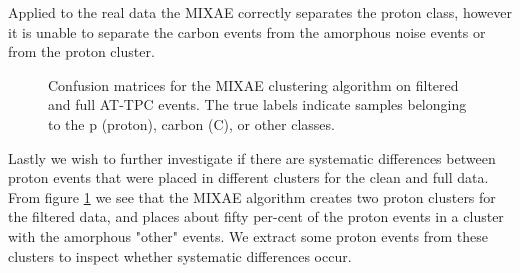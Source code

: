 \documentclass[preprint,12pt]{elsarticle}
\begin{document}
Applied to the real data the MIXAE correctly separates the proton class, however it is unable to separate the carbon events from the amorphous noise events or from the proton cluster. 

\begin{figure}[H]
\centering

	\hspace{-1cm}
\caption[MIXAE - confusion matrices]{Confusion matrices for the MIXAE clustering algorithm on filtered and full AT-TPC events. The true labels indicate samples belonging to the p (proton), carbon (C), or other classes. }\label{fig:mixae_confmat}
\end{figure}

Lastly we wish to further investigate if there are systematic differences between proton events that were placed in different clusters for the clean and full data. From figure \ref{fig:mixae_confmat} we see that the MIXAE algorithm creates two proton clusters for the filtered data, and places about fifty per-cent of the proton events in a cluster with the amorphous "other" events. We extract some proton events from these clusters to inspect whether systematic differences occur. 
\end{document}
